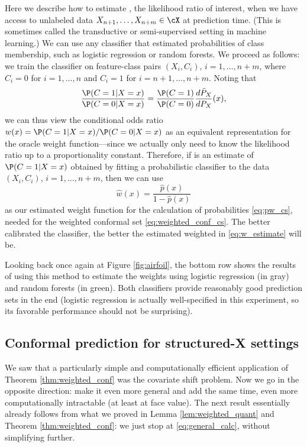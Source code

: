\documentclass{article}
\begin{document}
Here we describe how to estimate , the likelihood ratio
of interest, when we have access to unlabeled data $X_{n+1},\dots,X_{n+m} \in
\cX$ at prediction time. (This is sometimes called the transductive or
semi-supervised setting in machine learning.) We can use any classifier that
estimated probabilities of class membership, such as logistic regression or
random forests. We proceed as follows: we train the classifier on feature-class
pairs $(X_i,C_i)$, $i=1,\ldots,n+m$,  where $C_i=0$ for $i=1,\ldots,n$ and
$C_i=1$ for $i=n+1,\ldots,n+m$. Noting that   
\[
\frac{\P(C=1 | X=x)}{\P(C=0 | X=x)}
= \frac{\P(C=1)}{\P(C=0)} \frac{d\tP_X}{dP_X}(x),
\]
we can thus view the conditional odds ratio $w(x)=\P(C=1|X=x)/\P(C=0|X=x)$ as an
equivalent representation for the oracle weight function---since we actually
only need to know the likelihood ratio up to a proportionality 
constant. Therefore, if  is an estimate of $\P(C=1|X=x)$
obtained by fitting a probabilistic classifier to the data $(X_i,C_i)$,
$i=1,\ldots,n+m$, then we can use   
\begin{equation}
\label{eq:w_estimate}
\hat{w}(x) = \frac{\hat{p}(x)}{1-\hat{p}(x)}
\end{equation}
as our estimated weight function for the calculation of probabilities
\eqref{eq:pw_cs}, needed for the weighted conformal set
\eqref{eq:weighted_conf_cs}. The better calibrated the classifier, the better
the estimated weighted in \eqref{eq:w_estimate} will be.  

Looking back once again at Figure \ref{fig:airfoil}, the bottom row shows the
results of using this method to estimate the weights using logistic regression
(in gray) and random forests (in green). Both classifiers provide reasonably
good prediction sets in the end (logistic regression is actually well-specified 
in this experiment, so its favorable performance should not be surprising). 

\subsection{Conformal prediction for structured-X settings}

We saw that a particularly simple and computationally efficient application of
Theorem \ref{thm:weighted_conf} was the covariate shift problem. Now we go in
the opposite direction: make it even more general and add the same time, even
more computationally intractable (at least at face value). The next result
essentially already follows from what we proved in Lemma
\ref{lem:weighted_quant} and Theorem \ref{thm:weighted_conf}: we just stop at
\eqref{eq:general_calc}, without simplifying further. 
\end{document}
